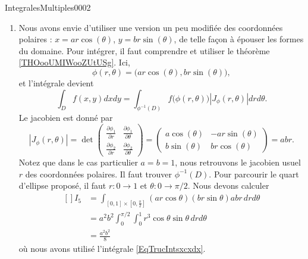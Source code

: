 \begin{corrige}{IntegralesMultiples0002}
\begin{enumerate}
		\item
			Nous avons envie d'utiliser une version un peu modifiée des coordonnées polaires : $x=ar\cos(\theta)$, $y=br\sin(\theta)$, de telle façon à épouser les formes du domaine. Pour intégrer, il faut comprendre et utiliser le théorème \ref{THOooUMIWooZUtUSg}. Ici,
			\begin{equation}
				\phi(r,\theta)=\big( ar\cos(\theta),br\sin(\theta) \big),
			\end{equation}
			et l'intégrale devient
			\begin{equation}
				\int_D f(x,y)dxdy=\int_{\phi^{-1}(D)}f\big( \phi(r,\theta) \big)| J_{\phi}(r,\theta) |drd\theta.
			\end{equation}
			Le jacobien est donné par
			\begin{equation}
				| J_{\phi}(r,\theta) |=\det\begin{pmatrix}
					\frac{ \partial \phi_1 }{ \partial r }	&	\frac{ \partial \phi_1 }{ \partial \theta }	\\ 
					\frac{ \partial \phi_2 }{ \partial r }	&	\frac{ \partial \phi_2 }{ \partial \theta }	
				\end{pmatrix}=
				\begin{pmatrix}
					a\cos(\theta)	&	-ar\sin(\theta)	\\ 
					b\sin(\theta)	&	br\cos(\theta)	
				\end{pmatrix}=
				abr.
			\end{equation}
			Notez que dans le cas particulier $a=b=1$, nous retrouvons le jacobien usuel $r$ des coordonnées polaires. Il faut trouver $\phi^{-1}(D)$. Pour parcourir le quart d'ellipse proposé, il faut $r\colon 0\to 1$ et $\theta\colon 0\to \pi/2$. Nous devons calculer
			\begin{equation}
				\begin{aligned}[]
					I_5&=\int_{[0,1]\times [0,\frac{ \pi }{2}]}(ar\cos\theta)(br\sin\theta) abr\,drd\theta\\
					&=a^2b^2\int_{0}^{\pi/2}\int_0^1r^3\cos\theta\sin\theta\,drd\theta\\
					&=\frac{ a^2b^2 }{ 8 }
				\end{aligned}
			\end{equation}
			où nous avons utilisé l'intégrale \eqref{EqTrucIntsxcxdx}.
			
	\end{enumerate}

\end{corrige}
